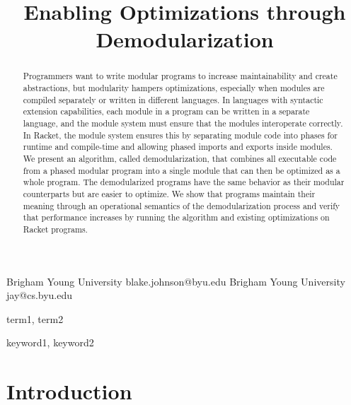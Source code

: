 \documentclass[preprint]{sigplanconf}
\begin{document}
\copyrightdata{[to be supplied]} 


\title{Enabling Optimizations through Demodularization} 

           {Brigham Young University}
           {blake.johnson@byu.edu}
           {Brigham Young University}
           {jay@cs.byu.edu}

\maketitle

\begin{abstract}
Programmers want to write modular programs to increase maintainability and create abstractions, but modularity hampers optimizations, especially when modules are compiled separately or written in different languages. 
In languages with syntactic extension capabilities, each module in a program can be written in a separate language, and the module system must ensure that the modules interoperate correctly. 
In Racket, the module system ensures this by separating module code into phases for runtime and compile-time and allowing phased imports and exports inside modules. 
We present an algorithm, called demodularization, that combines all executable code from a phased modular program into a single module that can then be optimized as a whole program. 
The demodularized programs have the same behavior as their modular counterparts but are easier to optimize. 
We show that programs maintain their meaning through an operational semantics of the demodularization process and verify that performance increases by running the algorithm and existing optimizations on Racket programs.
\end{abstract}


\terms
term1, term2

\keywords
keyword1, keyword2

\section{Introduction}
\end{document}
